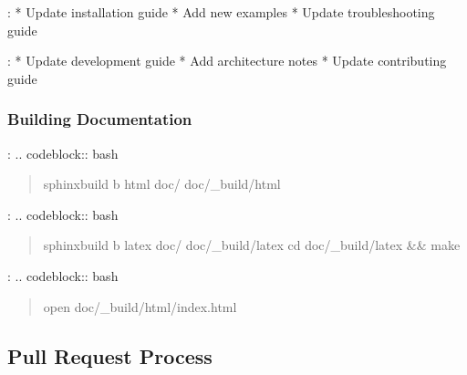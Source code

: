 \documentclass[a4paper,10pt,english,openany,oneside]{sphinxmanual}
\begin{document}
\sphinxAtStartPar
{}:
* Update installation guide
* Add new examples
* Update troubleshooting guide

\sphinxAtStartPar
{}:
* Update development guide
* Add architecture notes
* Update contributing guide


\subsubsection{Building Documentation}
\label{\detokenize{contributing:building-documentation}}
\sphinxAtStartPar
{}:
.. code\sphinxhyphen{}block:: bash
\begin{quote}

\sphinxAtStartPar
sphinx\sphinxhyphen{}build \sphinxhyphen{}b html doc/ doc/\_build/html
\end{quote}

\sphinxAtStartPar
{}:
.. code\sphinxhyphen{}block:: bash
\begin{quote}

\sphinxAtStartPar
sphinx\sphinxhyphen{}build \sphinxhyphen{}b latex doc/ doc/\_build/latex
cd doc/\_build/latex \&\& make
\end{quote}

\sphinxAtStartPar
{}:
.. code\sphinxhyphen{}block:: bash
\begin{quote}

\sphinxAtStartPar
open doc/\_build/html/index.html
\end{quote}


\subsection{Pull Request Process}
\label{\detokenize{contributing:pull-request-process}}
\end{document}
